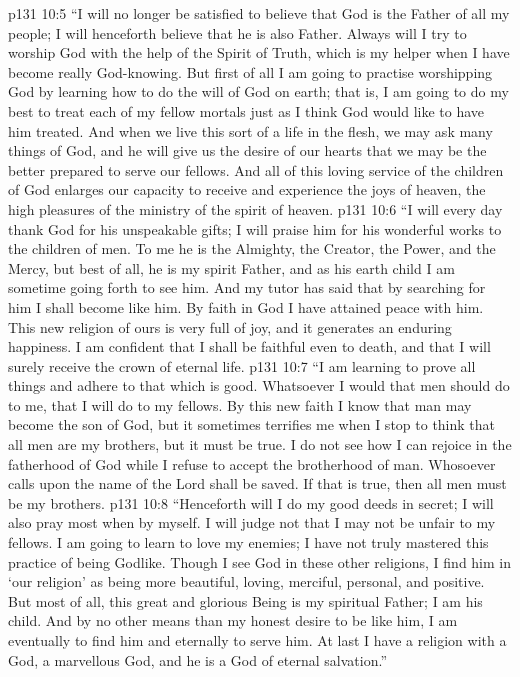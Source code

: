 \vs p131 10:5 “I will no longer be satisfied to believe that God is the Father of all my people; I will henceforth believe that he is also  Father. Always will I try to worship God with the help of the Spirit of Truth, which is my helper when I have become really God\hyp{}knowing. But first of all I am going to practise worshipping God by learning how to do the will of God on earth; that is, I am going to do my best to treat each of my fellow mortals just as I think God would like to have him treated. And when we live this sort of a life in the flesh, we may ask many things of God, and he will give us the desire of our hearts that we may be the better prepared to serve our fellows. And all of this loving service of the children of God enlarges our capacity to receive and experience the joys of heaven, the high pleasures of the ministry of the spirit of heaven.
\vs p131 10:6 “I will every day thank God for his unspeakable gifts; I will praise him for his wonderful works to the children of men. To me he is the Almighty, the Creator, the Power, and the Mercy, but best of all, he is my spirit Father, and as his earth child I am sometime going forth to see him. And my tutor has said that by searching for him I shall become like him. By faith in God I have attained peace with him. This new religion of ours is very full of joy, and it generates an enduring happiness. I am confident that I shall be faithful even to death, and that I will surely receive the crown of eternal life.
\vs p131 10:7 “I am learning to prove all things and adhere to that which is good. Whatsoever I would that men should do to me, that I will do to my fellows. By this new faith I know that man may become the son of God, but it sometimes terrifies me when I stop to think that all men are my brothers, but it must be true. I do not see how I can rejoice in the fatherhood of God while I refuse to accept the brotherhood of man. Whosoever calls upon the name of the Lord shall be saved. If that is true, then all men must be my brothers.
\vs p131 10:8 “Henceforth will I do my good deeds in secret; I will also pray most when by myself. I will judge not that I may not be unfair to my fellows. I am going to learn to love my enemies; I have not truly mastered this practice of being Godlike. Though I see God in these other religions, I find him in ‘our religion’ as being more beautiful, loving, merciful, personal, and positive. But most of all, this great and glorious Being is my spiritual Father; I am his child. And by no other means than my honest desire to be like him, I am eventually to find him and eternally to serve him. At last I have a religion with a God, a marvellous God, and he is a God of eternal salvation.”
